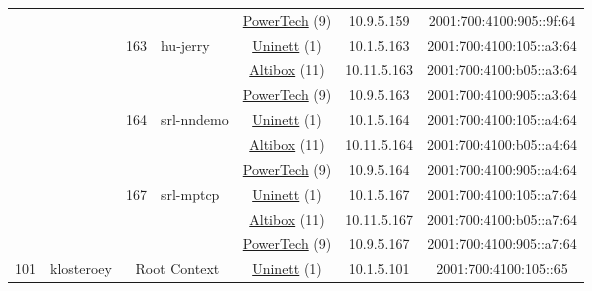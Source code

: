 \begin{small}
\begin{center}
\begin{longtable}{|c|c|c|c|c|c|c|c|}
  &  &  &  & \multicolumn{2}{|c|}{\tiny{\href{http://www.powertech.no}{PowerTech} (9)}} & \tiny{10.9.5.159} & \tiny{2001:700:4100:905::9f:64} \\* \cline{3-3}\cline{4-4}\cline{5-5}\cline{6-6}\cline{7-7}\cline{8-8}
  &  & \multirow{3}{*}{\tiny{163}} & \multicolumn{1}{|l|}{\multirow{3}{*}{\tiny{hu-jerry}}} & \multicolumn{2}{|c|}{\tiny{\href{https://www.uninett.no}{Uninett} (1)}} & \tiny{10.1.5.163} & \tiny{2001:700:4100:105::a3:64} \\* \cline{5-5}\cline{6-6}\cline{7-7}\cline{8-8}
  &  &  &  & \multicolumn{2}{|c|}{\tiny{\href{https://www.altibox.no}{Altibox} (11)}} & \tiny{10.11.5.163} & \tiny{2001:700:4100:b05::a3:64} \\* \cline{5-5}\cline{6-6}\cline{7-7}\cline{8-8}
  &  &  &  & \multicolumn{2}{|c|}{\tiny{\href{http://www.powertech.no}{PowerTech} (9)}} & \tiny{10.9.5.163} & \tiny{2001:700:4100:905::a3:64} \\* \cline{3-3}\cline{4-4}\cline{5-5}\cline{6-6}\cline{7-7}\cline{8-8}
  &  & \multirow{3}{*}{\tiny{164}} & \multicolumn{1}{|l|}{\multirow{3}{*}{\tiny{srl-nndemo}}} & \multicolumn{2}{|c|}{\tiny{\href{https://www.uninett.no}{Uninett} (1)}} & \tiny{10.1.5.164} & \tiny{2001:700:4100:105::a4:64} \\* \cline{5-5}\cline{6-6}\cline{7-7}\cline{8-8}
  &  &  &  & \multicolumn{2}{|c|}{\tiny{\href{https://www.altibox.no}{Altibox} (11)}} & \tiny{10.11.5.164} & \tiny{2001:700:4100:b05::a4:64} \\* \cline{5-5}\cline{6-6}\cline{7-7}\cline{8-8}
  &  &  &  & \multicolumn{2}{|c|}{\tiny{\href{http://www.powertech.no}{PowerTech} (9)}} & \tiny{10.9.5.164} & \tiny{2001:700:4100:905::a4:64} \\* \cline{3-3}\cline{4-4}\cline{5-5}\cline{6-6}\cline{7-7}\cline{8-8}
  &  & \multirow{3}{*}{\tiny{167}} & \multicolumn{1}{|l|}{\multirow{3}{*}{\tiny{srl-mptcp}}} & \multicolumn{2}{|c|}{\tiny{\href{https://www.uninett.no}{Uninett} (1)}} & \tiny{10.1.5.167} & \tiny{2001:700:4100:105::a7:64} \\* \cline{5-5}\cline{6-6}\cline{7-7}\cline{8-8}
  &  &  &  & \multicolumn{2}{|c|}{\tiny{\href{https://www.altibox.no}{Altibox} (11)}} & \tiny{10.11.5.167} & \tiny{2001:700:4100:b05::a7:64} \\* \cline{5-5}\cline{6-6}\cline{7-7}\cline{8-8}
  &  &  &  & \multicolumn{2}{|c|}{\tiny{\href{http://www.powertech.no}{PowerTech} (9)}} & \tiny{10.9.5.167} & \tiny{2001:700:4100:905::a7:64} \\ \hline
 \multirow{18}{*}{\tiny{101}} & \multicolumn{1}{|l|}{\multirow{18}{*}{\tiny{klosteroey}}} & \multicolumn{2}{|c|}{\multirow{3}{*}{\tiny{Root Context}}} & \multicolumn{2}{|c|}{\tiny{\href{https://www.uninett.no}{Uninett} (1)}} & \tiny{10.1.5.101} & \tiny{2001:700:4100:105::65} \\* \cline{5-5}\cline{6-6}\cline{7-7}\cline{8-8}

\end{longtable}
\end{center}
\end{small}
